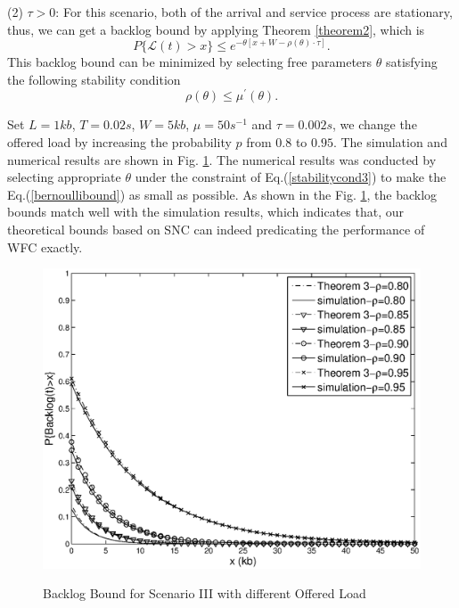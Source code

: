 \documentclass[paper]{ieice}
\begin{document}
(2) $\tau> 0$: For this scenario, both of the arrival and service process are stationary, thus, we can get a backlog bound by applying Theorem \ref{theorem2}, which is
\begin{equation}\label{bernoullibound}
P\{\mathcal{L}(t)>x\}\leq e^{-\theta [x+W-\rho(\theta)\cdot \tau]}.
\end{equation}
This backlog bound can be minimized by selecting free parameters $\theta$ satisfying the following stability condition
\begin{equation}\label{stabilitycond3}
\rho(\theta)\leq \mu^\prime(\theta).
\end{equation}

Set $L=1kb$, $T=0.02s$, $W=5kb$, $\mu=50s^{-1}$ and $\tau=0.002s$, we change the offered load by increasing the probability $p$ from $0.8$ to $0.95$. The simulation and numerical results are shown in Fig. \ref{result2}. The numerical results was conducted by selecting appropriate $\theta$ under the constraint of Eq.(\ref{stabilitycond3}) to make the Eq.(\ref{bernoullibound}) as small as possible. As shown in the Fig. \ref{result2}, the backlog bounds match well with the simulation results, which indicates that, our theoretical bounds based on SNC can indeed predicating the performance of WFC exactly.
\begin{figure}[tbp]
  \centering
  \includegraphics[scale=0.45]{figures/backlogrho.eps}\\
  \caption{Backlog Bound for Scenario III with different Offered Load}\label{result2}
\end{figure}
\end{document}
